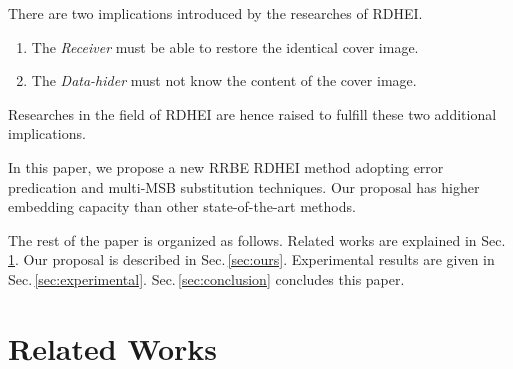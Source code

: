\documentclass{elsarticle}
\begin{document}
	There are two implications introduced by the researches of RDHEI.
	
	\begin{enumerate}
		\item The \emph{Receiver} must be able to restore the identical cover image.
		\item The \emph{Data-hider} must not know the content of the cover image.
	\end{enumerate}
	
	Researches in the field of RDHEI are hence raised to fulfill these two additional implications.
	
	In this paper, we propose a new RRBE RDHEI method adopting error predication and multi-MSB substitution techniques. 
	Our proposal has higher embedding capacity than other state-of-the-art methods.
	
	The rest of the paper is organized as follows. 
	Related works are explained in Sec.\,\ref{sec:related}. 
	Our proposal is described in Sec.\,\ref{sec:ours}. 
	Experimental results are given in Sec.\,\ref{sec:experimental}.
	Sec.\,\ref{sec:conclusion} concludes this paper. 
	
	
	\section{Related Works}
	\label{sec:related}
	
\end{document}
